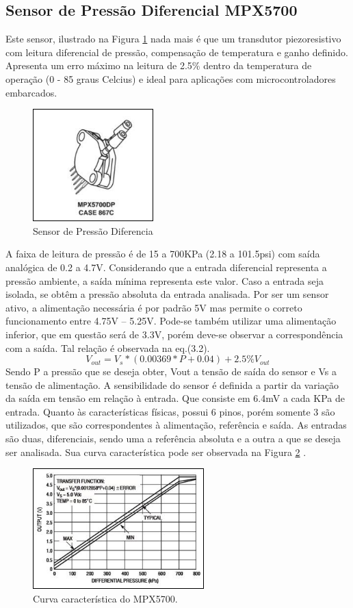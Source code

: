 \subsection{Sensor de Pressão Diferencial MPX5700}
Este sensor, ilustrado na Figura \ref{SensordePressao} nada mais é que um transdutor piezoresistivo com leitura diferencial de pressão, compensação de temperatura e ganho definido. Apresenta um erro máximo na leitura de 2.5\% dentro da temperatura de operação (0 -  85 graus Celcius) e ideal para aplicações com microcontroladores embarcados.
\begin{figure}[h!]
	\centering
	\includegraphics[keepaspectratio=true,scale= 1.5]{figuras/mpx_5700.PNG}
	\caption{ Sensor de Pressão Diferencia}
	\label{SensordePressao}
\end{figure}
A faixa de leitura de pressão é de 15 a 700KPa (2.18 a 101.5psi) com saída analógica de 0.2 a 4.7V. Considerando que a entrada diferencial representa a pressão ambiente, a saída mínima representa este valor. Caso a entrada seja isolada, se obtêm a pressão absoluta da entrada analisada.
Por ser um sensor ativo, a alimentação necessária é por padrão 5V mas permite o correto funcionamento entre 4.75V – 5.25V. Pode-se também utilizar uma alimentação inferior, que em questão será de 3.3V, porém deve-se observar a correspondência com a saída. Tal relação é observada na eq.(3.2).
\begin{equation}
V_{out} = V_{s}*(0.00369 * P + 0.04)+2.5\%V_{out} 	
\end{equation}
Sendo P a pressão que se deseja obter, Vout a tensão de saída do sensor e Vs a tensão de alimentação.
A sensibilidade do sensor é definida a partir da variação da saída em tensão em relação à entrada. Que consiste em 6.4mV a cada KPa de entrada.
Quanto às características físicas, possui 6 pinos, porém somente 3 são utilizados, que são correspondentes à alimentação, referência e saída. As entradas são duas, diferenciais, sendo uma a referência absoluta e a outra a que se deseja ser analisada.
Sua curva característica pode ser observada na Figura \ref{Curva} . 
\begin{figure}[h!]
	\centering
	\includegraphics[keepaspectratio=true,scale= 1.5]{figuras/curva_carc.PNG}
	\caption{ Curva característica do MPX5700.}
	\label{Curva}
\end{figure}
